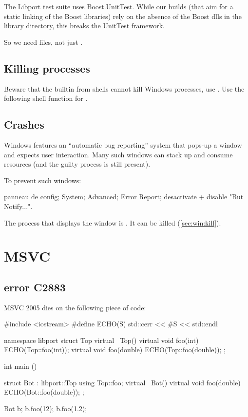 \documentclass[openright,twoside,11pt]{book}
\begin{document}
The Libport test suite uses Boost.UnitTest.  While our builds (that
aim for a static linking of the Boost libraries) rely on the absence
of the Boost dlls in the library directory, this breaks the UnitTest
framework.

So we need  files, not just
.

\subsection{Killing processes}
\label{sec:win:kill}
Beware that the  builtin from shells cannot kill Windows
processes, use .  Use the following shell function
for .


\subsection{Crashes}

Windows features an ``automatic bug reporting'' system that pops-up a
window and expects user interaction.  Many such windows can stack up
and consume resources (and the guilty process is still present).

To prevent such windows:

panneau de config; System; Advanced; Error Report; desactivate +
disable "But Notify...".

The process that displays the window is .  It can
be killed (\autoref{sec:win:kill}).

\section{MSVC}

\subsection{error C2883}
MSVC 2005 dies on the following piece of code:

\begin{cxx}
#include <iostream>
#define ECHO(S) std::cerr << #S << std::endl

namespace libport
{
  struct Top
  {
    virtual ~Top() {}
    virtual void foo(int)    { ECHO(Top::foo(int)); }
    virtual void foo(double) { ECHO(Top::foo(double)); }
  };
}

int
main ()
{
  struct Bot : libport::Top
  {
    using Top::foo;
    virtual ~Bot() {}
    virtual void foo(double) { ECHO(Bot::foo(double)); }
  };

  Bot b;
  b.foo(12);
  b.foo(1.2);
}
\end{cxx}
\end{document}
